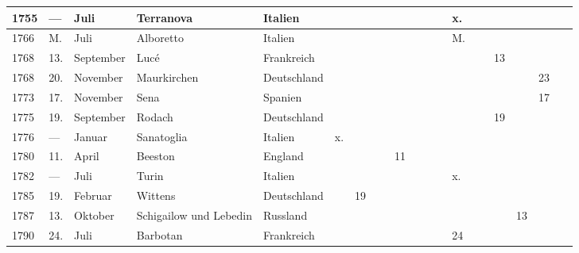 \documentclass[a4paper, 8pt, oneside, polutonikogreek, german]{article}
\begin{document}
\begin{landscape}
\begin{table}[H]
\begin{longtable}{|p{5mm}|p{4mm}|p{13mm}|p{17mm}|p{17mm}|p{4mm}|p{6mm}|p{6mm}|p{6mm}|p{4mm}|p{5mm}|p{4mm}|p{5mm}|p{6mm}|p{5mm}|p{5mm}|p{5mm}|}
        1755 & --- & Juli & Terranova & Italien & ~ & ~ & ~ & ~ & ~ & ~ & x. & ~ & ~ & ~ & ~ & ~ \\ \hline
        1766 & M. & Juli & Alboretto & Italien & ~ & ~ & ~ & ~ & ~ & ~ & M. & ~ & ~ & ~ & ~ & ~ \\ \hline
        1768 & 13. & September & Lucé & Frankreich & ~ & ~ & ~ & ~ & ~ & ~ & ~ & ~ & 13 & ~ & ~ & ~ \\ \hline
        1768 & 20. & November & Maurkirchen & Deutschland & ~ & ~ & ~ & ~ & ~ & ~ & ~ & ~ & ~ & ~ & 23 & ~ \\ \hline
        1773 & 17. & November & Sena & Spanien & ~ & ~ & ~ & ~ & ~ & ~ & ~ & ~ & ~ & ~ & 17 & ~ \\ \hline
        1775 & 19. & September & Rodach & Deutschland & ~ & ~ & ~ & ~ & ~ & ~ & ~ & ~ & 19 & ~ & ~ & ~ \\ \hline
        1776 & --- & Januar & Sanatoglia & Italien & x. & ~ & ~ & ~ & ~ & ~ & ~ & ~ & ~ & ~ & ~ & ~ \\ \hline
        1780 & 11. & April & Beeston & England & ~ & ~ & ~ & 11 & ~ & ~ & ~ & ~ & ~ & ~ & ~ & ~ \\ \hline
        1782 & --- & Juli & Turin & Italien & ~ & ~ & ~ & ~ & ~ & ~ & x. & ~ & ~ & ~ & ~ & ~ \\ \hline
        1785 & 19. & Februar & Wittens & Deutschland & ~ & 19 & ~ & ~ & ~ & ~ & ~ & ~ & ~ & ~ & ~ & ~ \\ \hline
        1787 & 13. & Oktober & Schigailow und Lebedin & Russland & ~ & ~ & ~ & ~ & ~ & ~ & ~ & ~ & ~ & 13 & ~ & ~ \\ \hline
        1790 & 24. & Juli & Barbotan & Frankreich & ~ & ~ & ~ & ~ & ~ & ~ & 24 & ~ & ~ & ~ & ~ & ~ \\ \hline
    \end{longtable}
\end{table}
\end{landscape}
\clearpage
\end{document}
